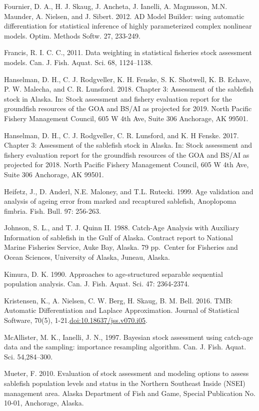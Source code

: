 \documentclass[]{article}
\begin{document}
Fournier, D. A., H. J. Skaug, J. Ancheta, J. Ianelli, A. Magnusson, M.N.
Maunder, A. Nielsen, and J. Sibert. 2012. AD Model Builder: using
automatic differentiation for statistical inference of highly
parameterized complex nonlinear models. Optim. Methods Softw. 27,
233-249.

Francis, R. I. C. C., 2011. Data weighting in statistical fisheries
stock assessment models. Can. J. Fish. Aquat. Sci. 68, 1124--1138.

Hanselman, D. H., C. J. Rodgveller, K. H. Fenske, S. K. Shotwell, K. B.
Echave, P. W. Malecha, and C. R. Lunsford. 2018. Chapter 3: Assessment
of the sablefish stock in Alaska. In: Stock assessment and fishery
evaluation report for the groundfish resources of the GOA and BS/AI as
projected for 2019. North Pacific Fishery Management Council, 605 W 4th
Ave, Suite 306 Anchorage, AK 99501.

Hanselman, D. H., C. J. Rodgveller, C. R. Lunsford, and K. H Fenske.
2017. Chapter 3: Assessment of the sablefish stock in Alaska. In: Stock
assessment and fishery evaluation report for the groundfish resources of
the GOA and BS/AI as projected for 2018. North Pacific Fishery
Management Council, 605 W 4th Ave, Suite 306 Anchorage, AK 99501.

Heifetz, J., D. Anderl, N.E. Maloney, and T.L. Rutecki. 1999. Age
validation and analysis of ageing error from marked and recaptured
sablefish, Anoplopoma fimbria. Fish. Bull. 97: 256-263.

Johnson, S. L., and T. J. Quinn II. 1988. Catch-Age Analysis with
Auxiliary Information of sablefish in the Gulf of Alaska. Contract
report to National Marine Fisheries Service, Auke Bay, Alaska. 79
pp.~Center for Fisheries and Ocean Sciences, University of Alaska,
Juneau, Alaska.

Kimura, D. K. 1990. Approaches to age-structured separable sequential
population analysis. Can. J. Fish. Aquat. Sci. 47: 2364-2374.

Kristensen, K., A. Nielsen, C. W. Berg, H. Skaug, B. M. Bell. 2016. TMB:
Automatic Differentiation and Laplace Approximation. Journal of
Statistical Software, 70(5), 1-21.\url{doi:10.18637/jss.v070.i05}.

McAllister, M. K., Ianelli, J. N., 1997. Bayesian stock assessment using
catch-age data and the sampling: importance resampling algorithm. Can.
J. Fish. Aquat. Sci. 54,284--300.

Mueter, F. 2010. Evaluation of stock assessment and modeling options to
assess sablefish population levels and status in the Northern Southeast
Inside (NSEI) management area. Alaska Department of Fish and Game,
Special Publication No. 10-01, Anchorage, Alaska.
\end{document}
